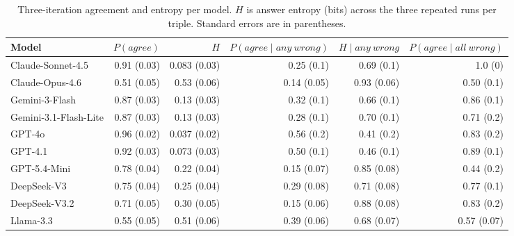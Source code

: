 \begin{table}[t]
\centering
\small
\renewcommand{\arraystretch}{1.08}
\caption{Three-iteration agreement and entropy per model. $H$ is answer entropy (bits) across the three repeated runs per triple. Standard errors are in parentheses.}
\label{tab:identity_agreement_entropy}
\begin{tabular}{lrrrrr}
\toprule
Model & $P(agree)$ & $H$ & $P(agree\mid any\ wrong)$ & $H\mid any\ wrong$ & $P(agree\mid all\ wrong)$ \\
\midrule
Claude-Sonnet-4.5 & 0.91 (0.03) & 0.083 (0.03) & 0.25 (0.1) & 0.69 (0.1) & 1.0 (0) \\
Claude-Opus-4.6 & 0.51 (0.05) & 0.53 (0.06) & 0.14 (0.05) & 0.93 (0.06) & 0.50 (0.1) \\
Gemini-3-Flash & 0.87 (0.03) & 0.13 (0.03) & 0.32 (0.1) & 0.66 (0.1) & 0.86 (0.1) \\
Gemini-3.1-Flash-Lite & 0.87 (0.03) & 0.13 (0.03) & 0.28 (0.1) & 0.70 (0.1) & 0.71 (0.2) \\
GPT-4o & 0.96 (0.02) & 0.037 (0.02) & 0.56 (0.2) & 0.41 (0.2) & 0.83 (0.2) \\
GPT-4.1 & 0.92 (0.03) & 0.073 (0.03) & 0.50 (0.1) & 0.46 (0.1) & 0.89 (0.1) \\
GPT-5.4-Mini & 0.78 (0.04) & 0.22 (0.04) & 0.15 (0.07) & 0.85 (0.08) & 0.44 (0.2) \\
DeepSeek-V3 & 0.75 (0.04) & 0.25 (0.04) & 0.29 (0.08) & 0.71 (0.08) & 0.77 (0.1) \\
DeepSeek-V3.2 & 0.71 (0.05) & 0.30 (0.05) & 0.15 (0.06) & 0.88 (0.08) & 0.83 (0.2) \\
Llama-3.3 & 0.55 (0.05) & 0.51 (0.06) & 0.39 (0.06) & 0.68 (0.07) & 0.57 (0.07) \\
\bottomrule
\end{tabular}
\end{table}
